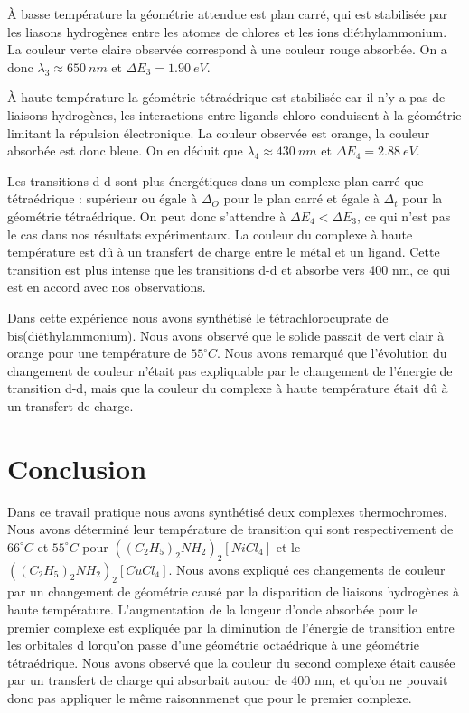 \documentclass[12pt]{article}
\begin{document}
À basse température la géométrie attendue est plan carré, qui est stabilisée par les liasons hydrogènes entre les atomes de chlores et les ions diéthylammonium.
La couleur verte claire observée correspond à une couleur rouge absorbée.
On a donc $\lambda_3\approx 650 \ nm$ et $\Delta E_3 = 1.90 \ eV$.

À haute température la géométrie tétraédrique est stabilisée car il n'y a pas de liaisons hydrogènes, les interactions entre ligands chloro conduisent à la géométrie limitant la répulsion électronique.
La couleur observée est orange, la couleur absorbée est donc bleue. 
On en déduit que $\lambda_4\approx 430 \ nm$ et $\Delta E_4=2.88 \ eV$.

Les transitions d-d sont plus énergétiques dans un complexe plan carré que tétraédrique : supérieur ou égale à $\Delta_O$ pour le plan carré et égale à $\Delta_t$ pour la géométrie tétraédrique.
On peut donc s'attendre à $\Delta E_4 < \Delta E_3$, ce qui n'est pas le cas dans nos résultats expérimentaux.
La couleur du complexe à haute température est dû à un transfert de charge entre le métal et un ligand.
Cette transition est plus intense que les transitions d-d et absorbe vers 400 nm, ce qui est en accord avec nos observations.

Dans cette expérience nous avons synthétisé le  tétrachlorocuprate de bis(diéthylammonium). Nous avons observé que le solide passait de vert clair à orange pour une température de $55 ^\circ C$.
Nous avons remarqué que l'évolution du changement de couleur n'était pas expliquable par le changement de l'énergie de transition d-d, mais que la couleur du complexe à haute température était dû à un transfert de charge.

\section{Conclusion}

Dans ce travail pratique nous avons synthétisé deux complexes thermochromes.
Nous avons déterminé leur température de transition qui sont respectivement de $66 ^\circ C$ et $55 ^\circ C$ pour $((C_2H_5)_2NH_2)_2[NiCl_4]$ et le  $((C_2H_5)_2NH_2)_2[CuCl_4]$.
Nous avons expliqué ces changements de couleur par un changement de géométrie causé par la disparition de liaisons hydrogènes à haute température.
L'augmentation de la longeur d'onde absorbée pour le premier complexe est expliquée par la diminution de l'énergie de transition entre les orbitales d lorqu'on passe d'une géométrie octaédrique à une géométrie tétraédrique.
Nous avons observé que la couleur du second complexe était causée par un transfert de charge qui absorbait autour de 400 nm, et qu'on ne pouvait donc pas appliquer le même raisonnmenet que pour le premier complexe. 
\end{document}
